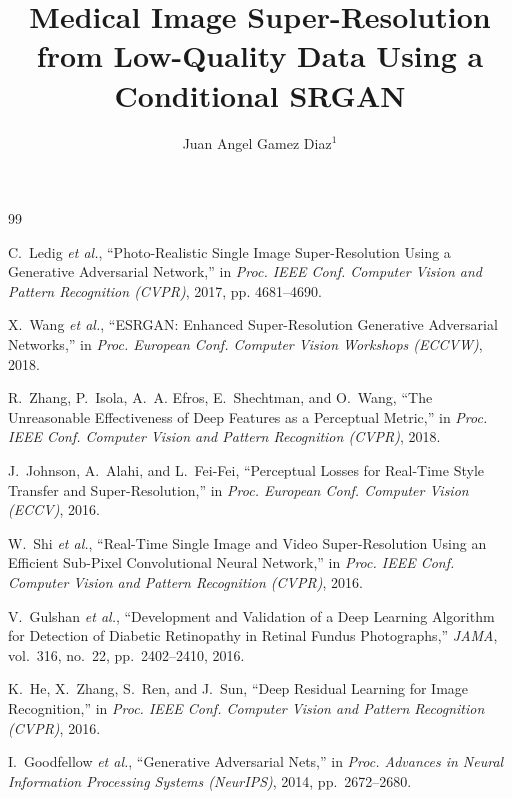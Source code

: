 \documentclass[10pt,a4paper,twocolumn,english]{article}
\title{Medical Image Super-Resolution from Low-Quality Data Using a Conditional SRGAN}
\author{Juan Angel Gamez Diaz$^1$}
\begin{document}
\twocolumn[
\begin{@twocolumnfalse}
\maketitle
\end{@twocolumnfalse}
]








\newpage
\renewcommand{\refname}{REFERENCES}

\begin{thebibliography}{99}

C.~Ledig \textit{et al.}, ``Photo-Realistic Single Image Super-Resolution Using a Generative Adversarial Network,'' in \textit{Proc. IEEE Conf. Computer Vision and Pattern Recognition (CVPR)}, 2017, pp. 4681--4690.

X.~Wang \textit{et al.}, ``ESRGAN: Enhanced Super-Resolution Generative Adversarial Networks,'' in \textit{Proc. European Conf. Computer Vision Workshops (ECCVW)}, 2018.

R.~Zhang, P.~Isola, A.~A. Efros, E.~Shechtman, and O.~Wang, ``The Unreasonable Effectiveness of Deep Features as a Perceptual Metric,'' in \textit{Proc. IEEE Conf. Computer Vision and Pattern Recognition (CVPR)}, 2018.

J.~Johnson, A.~Alahi, and L.~Fei-Fei, ``Perceptual Losses for Real-Time Style Transfer and Super-Resolution,'' in \textit{Proc. European Conf. Computer Vision (ECCV)}, 2016.

W.~Shi \textit{et al.}, ``Real-Time Single Image and Video Super-Resolution Using an Efficient Sub-Pixel Convolutional Neural Network,'' in \textit{Proc. IEEE Conf. Computer Vision and Pattern Recognition (CVPR)}, 2016.

V.~Gulshan \textit{et al.}, ``Development and Validation of a Deep Learning Algorithm for Detection of Diabetic Retinopathy in Retinal Fundus Photographs,'' \textit{JAMA}, vol.~316, no.~22, pp.~2402--2410, 2016.

K.~He, X.~Zhang, S.~Ren, and J.~Sun, ``Deep Residual Learning for Image Recognition,'' in \textit{Proc. IEEE Conf. Computer Vision and Pattern Recognition (CVPR)}, 2016.

I.~Goodfellow \textit{et al.}, ``Generative Adversarial Nets,'' in \textit{Proc. Advances in Neural Information Processing Systems (NeurIPS)}, 2014, pp.~2672--2680.


\end{thebibliography}
\end{document}
